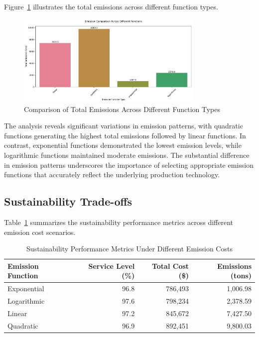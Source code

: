 Figure~\ref{fig:emission_comparison} illustrates the total emissions across different function types.
\begin{figure}[htbp]
\centering
\includegraphics[width=0.8\textwidth]{images/emission_comparison.pdf}
\caption{Comparison of Total Emissions Across Different Function Types}
\label{fig:emission_comparison}
\end{figure}

The analysis reveals significant variations in emission patterns, with quadratic functions generating the highest total emissions followed by linear functions. In contrast, exponential functions demonstrated the lowest emission levels, while logarithmic functions maintained moderate emissions. The substantial difference in emission patterns underscores the importance of selecting appropriate emission functions that accurately reflect the underlying production technology.

\subsection{Sustainability Trade-offs}
Table~\ref{tab:sustainability} summarizes the sustainability performance metrics across different emission cost scenarios.

\begin{table}[htbp]
\centering
\caption{Sustainability Performance Metrics Under Different Emission Costs}
\label{tab:sustainability}
\begin{tabular}{lrrr}
\hline
Emission Function & Service Level (\%) & Total Cost (\$) & Emissions (tons) \\
\hline
Exponential & 96.8 & 786,493 & 1,006.98 \\
Logarithmic & 97.6 & 798,234 & 2,378.59 \\
Linear & 97.2 & 845,672 & 7,427.50 \\
Quadratic & 96.9 & 892,451 & 9,800.03 \\
\hline
\end{tabular}
\end{table}

